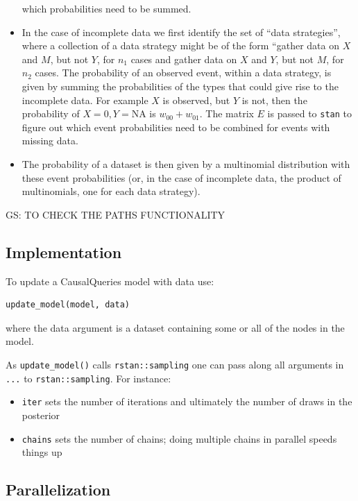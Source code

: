 \documentclass[
  article]{jss}
\providecommand{\tightlist}{%
  \setlength{\itemsep}{0pt}\setlength{\parskip}{0pt}}\usepackage{longtable,booktabs,array}
\begin{document}
\begin{itemize}
  which probabilities need to be summed.
\item
  In the case of incomplete data we first identify the set of ``data
  strategies'', where a collection of a data strategy might be of the
  form ``gather data on \(X\) and \(M\), but not \(Y\), for \(n_1\)
  cases and gather data on \(X\) and \(Y\), but not \(M\), for \(n_2\)
  cases. The probability of an observed event, within a data strategy,
  is given by summing the probabilities of the types that could give
  rise to the incomplete data. For example \(X\) is observed, but \(Y\)
  is not, then the probability of \(X=0, Y = \text{NA}\) is
  \(w_{00} +w_{01}\). The matrix \(E\) is passed to \texttt{stan} to
  figure out which event probabilities need to be combined for events
  with missing data.
\item
  The probability of a dataset is then given by a multinomial
  distribution with these event probabilities (or, in the case of
  incomplete data, the product of multinomials, one for each data
  strategy).
\end{itemize}

GS: TO CHECK THE PATHS FUNCTIONALITY

\hypertarget{implementation}{%
\subsection{Implementation}\label{implementation}}

To update a CausalQueries model with data use:

\begin{verbatim}
update_model(model, data)
\end{verbatim}

where the data argument is a dataset containing some or all of the nodes
in the model.

As \texttt{update\_model()} calls \texttt{rstan::sampling} one can pass
along all arguments in \texttt{...} to \texttt{rstan::sampling}. For
instance:

\begin{itemize}
\tightlist
\item
  \texttt{iter} sets the number of iterations and ultimately the number
  of draws in the posterior
\item
  \texttt{chains} sets the number of chains; doing multiple chains in
  parallel speeds things up
\end{itemize}

\hypertarget{parallelization}{%
\subsection{Parallelization}\label{parallelization}}
\end{document}
